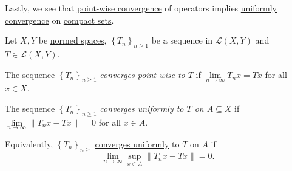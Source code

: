 Lastly, we see that \hyperref[def:point-wise-convergence]{point-wise convergence} of operators implies \hyperref[def:uniformly-convergence]{uniformly convergence} on \hyperref[def:compact]{compact sets}.

\begin{definition*}
	Let \(X, Y\) be \hyperref[def:normed-vector-space]{normed spaces}, \(\left\{ T_n \right\}_{n\geq 1}\) be a sequence in \(\mathcal{L} (X, Y)\) and \(T\in \mathcal{L} (X, Y)\).
	\begin{definition}\label{def:point-wise-convergence}
		The sequence \(\left\{ T_n \right\} _{n \geq 1}\) \emph{converges point-wise to \(T\)} if \(\lim\limits_{n \to \infty} T_n x = Tx\) for all \(x\in X\).
	\end{definition}

	\begin{definition}\label{def:uniformly-convergence}
		The sequence \(\left\{ T_n \right\} _{n \geq 1}\) \emph{converges uniformly to \(T\) on \(A\subseteq X\)} if \(\lim\limits_{n \to \infty} \left\lVert T_n x - Tx\right\rVert = 0\)  for all \(x\in A\).
	\end{definition}
\end{definition*}

Equivalently, \(\left\{ T_n \right\} _{n\geq }\) \hyperref[def:uniformly-convergence]{converges uniformly} to \(T\) on \(A\) if
\[
	\lim_{n \to \infty} \sup_{x\in A} \left\lVert T_n x - Tx\right\rVert = 0.
\]

